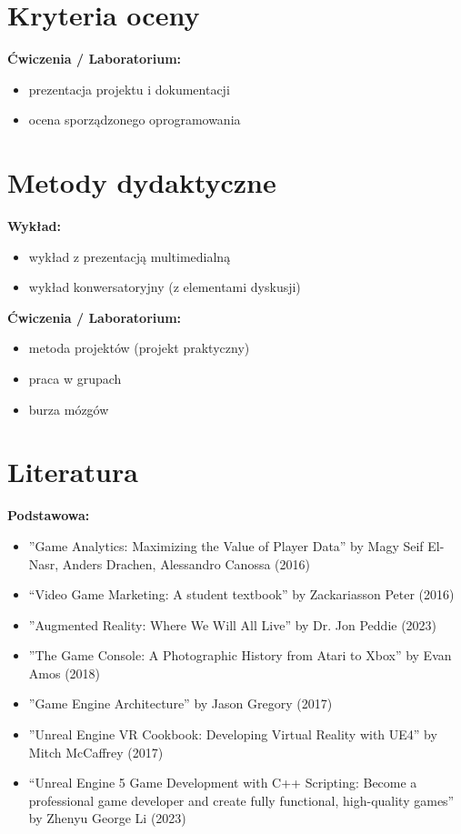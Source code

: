 \documentclass[12pt, a4paper]{article}
\begin{document}
\section{Kryteria oceny}

\textbf{Ćwiczenia / Laboratorium:}
\begin{itemize}
  \item prezentacja projektu i dokumentacji
  \item ocena sporządzonego oprogramowania
\end{itemize}


\section{Metody dydaktyczne}

\textbf{Wykład:}
\begin{itemize}
  \item wykład z prezentacją multimedialną
  \item wykład konwersatoryjny (z elementami dyskusji)
\end{itemize}
\vspace{4pt}
\textbf{Ćwiczenia / Laboratorium:}
\begin{itemize}
  \item metoda projektów (projekt praktyczny)
  \item praca w grupach
  \item burza mózgów
\end{itemize}
\vspace{4pt}


\section{Literatura}

\textbf{Podstawowa:}
\begin{itemize}
  \item ''Game Analytics: Maximizing the Value of Player Data'' by Magy Seif El-Nasr, Anders Drachen, Alessandro Canossa (2016)
  \item “Video Game Marketing: A student textbook” by Zackariasson Peter (2016)
  \item ''Augmented Reality: Where We Will All Live'' by Dr. Jon Peddie (2023)
  \item ''The Game Console: A Photographic History from Atari to Xbox'' by Evan Amos (2018)
  \item ''Game Engine Architecture'' by Jason Gregory (2017)
  \item ''Unreal Engine VR Cookbook: Developing Virtual Reality with UE4'' by Mitch McCaffrey (2017)
  \item “Unreal Engine 5 Game Development with C++ Scripting: Become a professional game developer and create fully functional, high-quality games” by Zhenyu George Li (2023)
\end{itemize}
\end{document}
